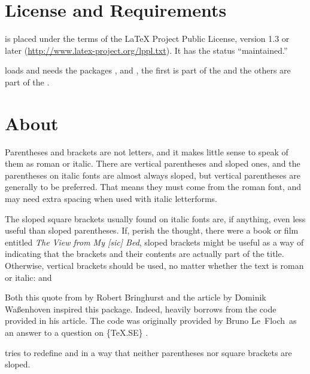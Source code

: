 \documentclass[DIV10,toc=index,toc=bib]{cnpkgdoc}
\begin{document}
\section{License and Requirements}
\embrac is placed under the terms of the LaTeX Project Public License,
version 1.3 or later (\url{http://www.latex-project.org/lppl.txt}).
It has the status ``maintained.''

\embrac loads and needs the packages ,  and
, the first is part of the  and the others are
part of the .

\section{About}\label{sec:about}
\begin{zitat}
 Parentheses and brackets are not letters, and it makes little sense to speak of
 them as roman or italic. There are vertical parentheses and sloped ones, and
 the parentheses on italic fonts are almost always sloped, but vertical parentheses
 are generally to be preferred. That means they must come from the roman font,
 and may need extra spacing when used with italic letterforms.
 
 The sloped square brackets usually found on italic fonts are, if anything, even
 less useful than sloped parentheses. If, perish the thought, there were a book
 or film entitled \emph*{The View from My [sic] Bed}, sloped brackets might be
 useful as a way of indicating that the brackets and their contents are actually
 part of the title. Otherwise, vertical brackets should be used, no matter whether
 the text is roman or italic:  and
\end{zitat}

Both this quote from  by Robert Bringhurst and the
article  by Dominik Waßenhoven \cite{dtk12-dw} inspired
this package. Indeed, \embrac heavily borrows from the code \citeauthor{dtk12-dw}
provided in his article\manythanks. The code was originally provided by Bruno
Le~Floch\manythanks\ as an answer to a question on \{TeX.SE\} \cite{lefloch11}.

\embrac tries to redefine  and  in a way that neither
parentheses nor square brackets are sloped. 
\end{document}
